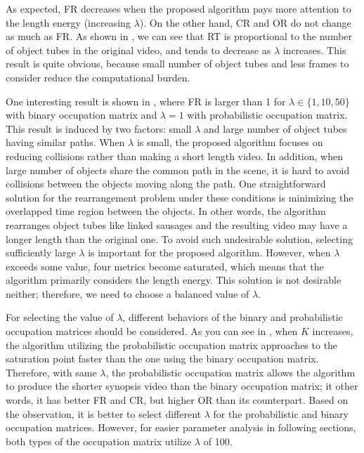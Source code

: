 \documentclass[11pt]{hyu_thesis}
\begin{document}
As expected, FR decreases when the proposed algorithm pays more attention to the length energy (increasing $\lambda$). On the other hand, CR and OR do not change as much as FR. As shown in , we can see that RT is proportional to the number of object tubes in the original video, and tends to decrease as $\lambda$ increases. This result is quite obvious, because small number of object tubes and less frames to consider reduce the computational burden.

One interesting result is shown in , where FR is larger than 1 for $\lambda \in \{1, 10, 50\}$ with binary occupation matrix and $\lambda=1$ with probabilistic occupation matrix. This result is induced by two factors: small $\lambda$ and large number of object tubes having similar paths. When $\lambda$ is small, the proposed algorithm focuses on reducing collisions rather than making a short length video. In addition, when large number of objects share the common path in the scene, it is hard to avoid collisions between the objects moving along the path. One straightforward solution for the rearrangement problem under these conditions is minimizing the overlapped time region between the objects. In other words, the algorithm rearranges object tubes like linked sausages and the resulting video may have a longer length than the original one. To avoid such undesirable solution, selecting sufficiently large $\lambda$ is important for the proposed algorithm. However, when $\lambda$ exceeds some value, four metrics become saturated, which means that the algorithm primarily considers the length energy. This solution is not desirable neither; therefore, we need to choose a balanced value of $\lambda$.

For selecting the value of $\lambda$, different behaviors of the binary and probabilistic occupation matrices should be considered. As you can see in , when $K$ increases, the algorithm utilizing the probabilistic occupation matrix approaches to the saturation point faster than the one using the binary occupation matrix. Therefore, with same $\lambda$, the probabilistic occupation matrix allows the algorithm to produce the shorter synopsis video than the binary occupation matrix; it other words, it has better FR and CR, but higher OR than its counterpart. Based on the observation, it is better to select different $\lambda$ for the probabilistic and binary occupation matrices. However, for easier parameter analysis in following sections, both types of the occupation matrix utilize $\lambda$ of 100.
\end{document}
